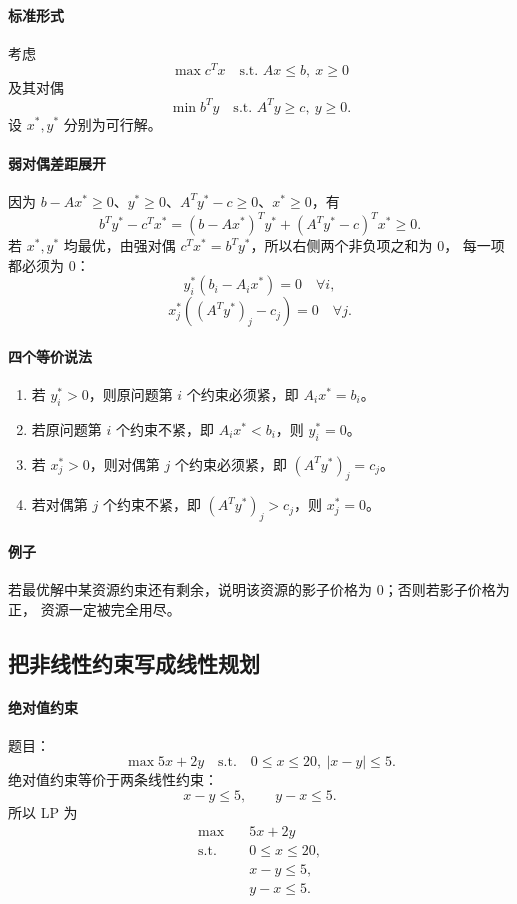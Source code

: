 \documentclass[UTF8,openany,12pt]{ctexbook}
\theoremstyle{remark}
\begin{document}
\paragraph{标准形式}
考虑
\[
  \max c^Tx \quad\text{s.t. } Ax\le b,\ x\ge 0
\]
及其对偶
\[
  \min b^Ty \quad\text{s.t. } A^Ty\ge c,\ y\ge 0.
\]
设 $x^*,y^*$ 分别为可行解。

\paragraph{弱对偶差距展开}
因为 $b-Ax^*\ge 0$、$y^*\ge0$、$A^Ty^*-c\ge0$、$x^*\ge0$，有
\[
  b^Ty^*-c^Tx^*
  =
  (b-Ax^*)^Ty^*+(A^Ty^*-c)^Tx^*
  \ge 0.
\]
若 $x^*,y^*$ 均最优，由强对偶 $c^Tx^*=b^Ty^*$，所以右侧两个非负项之和为 $0$，
每一项都必须为 $0$：
\[
  y_i^*(b_i-A_i x^*)=0\quad \forall i,
\]
\[
  x_j^*((A^Ty^*)_j-c_j)=0\quad \forall j.
\]

\paragraph{四个等价说法}
\begin{enumerate}
  \item 若 $y_i^*>0$，则原问题第 $i$ 个约束必须紧，即 $A_i x^*=b_i$。
  \item 若原问题第 $i$ 个约束不紧，即 $A_i x^*<b_i$，则 $y_i^*=0$。
  \item 若 $x_j^*>0$，则对偶第 $j$ 个约束必须紧，即 $(A^Ty^*)_j=c_j$。
  \item 若对偶第 $j$ 个约束不紧，即 $(A^Ty^*)_j>c_j$，则 $x_j^*=0$。
\end{enumerate}

\paragraph{例子}
若最优解中某资源约束还有剩余，说明该资源的影子价格为 $0$；否则若影子价格为正，
资源一定被完全用尽。

\subsection{把非线性约束写成线性规划}

\paragraph{绝对值约束}
题目：
\[
  \max 5x+2y
  \quad\text{s.t.}\quad
  0\le x\le 20,\ |x-y|\le 5.
\]
绝对值约束等价于两条线性约束：
\[
  x-y\le 5,\qquad y-x\le 5.
\]
所以 LP 为
\[
\begin{aligned}
  \max\quad &5x+2y\\
  \text{s.t.}\quad &0\le x\le 20,\\
  &x-y\le 5,\\
  &y-x\le 5.
\end{aligned}
\]
\end{document}
